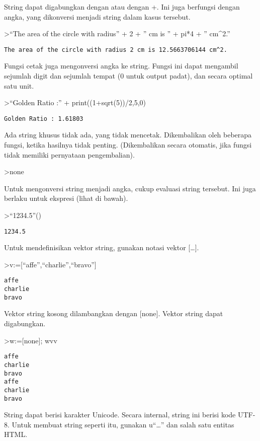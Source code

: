 \documentclass[
]{book}
\begin{document}
String dapat digabungkan dengan \textbar{} atau dengan +. Ini juga berfungsi dengan angka, yang dikonversi menjadi string dalam kasus tersebut.

\textgreater{}``The area of the circle with radius'' + 2 + '' cm is '' + pi*4 + '' cm\^{}2.''

\begin{verbatim}
The area of the circle with radius 2 cm is 12.5663706144 cm^2.
\end{verbatim}

Fungsi cetak juga mengonversi angka ke string. Fungsi ini dapat mengambil sejumlah digit dan sejumlah tempat (0 untuk output padat), dan secara optimal satu unit.

\textgreater{}``Golden Ratio :'' + print((1+sqrt(5))/2,5,0)

\begin{verbatim}
Golden Ratio : 1.61803
\end{verbatim}

Ada string khusus tidak ada, yang tidak mencetak. Dikembalikan oleh beberapa fungsi, ketika hasilnya tidak penting. (Dikembalikan secara otomatis, jika fungsi tidak memiliki pernyataan pengembalian).

\textgreater none

Untuk mengonversi string menjadi angka, cukup evaluasi string tersebut. Ini juga berlaku untuk ekspresi (lihat di bawah).

\textgreater{}``1234.5''()

\begin{verbatim}
1234.5
\end{verbatim}

Untuk mendefinisikan vektor string, gunakan notasi vektor {[}\ldots{]}.

\textgreater v:={[}``affe'',``charlie'',``bravo''{]}

\begin{verbatim}
affe
charlie
bravo
\end{verbatim}

Vektor string kosong dilambangkan dengan {[}none{]}. Vektor string dapat digabungkan.

\textgreater w:={[}none{]}; w\textbar v\textbar v

\begin{verbatim}
affe
charlie
bravo
affe
charlie
bravo
\end{verbatim}

String dapat berisi karakter Unicode. Secara internal, string ini berisi kode UTF-8. Untuk membuat string seperti itu, gunakan u``\ldots'' dan salah satu entitas HTML.
\end{document}
